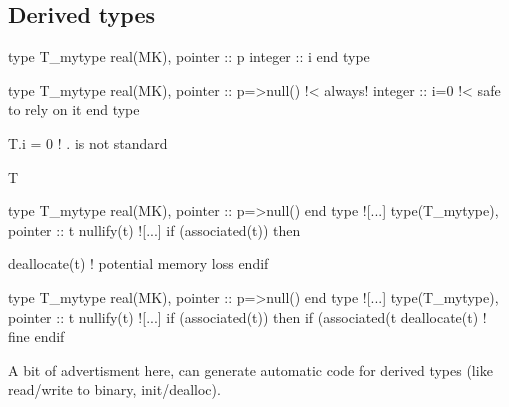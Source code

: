 \documentclass{article}
\begin{document}
\subsection{Derived types}
\label{sec:derivedtypes}
\begin{codea}
type T_mytype
  real(MK), pointer :: p
  integer :: i
end type
\end{codea} 
\begin{codeb}
type T_mytype
  real(MK), pointer :: p=>null() !< always!
  integer :: i=0 !< safe to rely on it
end type
\end{codeb}
\begin{codea}
T.i = 0 ! . is not standard
\end{codea} 
\begin{codeb}
T%
\end{codeb}
\begin{codea}
type T_mytype
  real(MK), pointer :: p=>null() 
end type
![...]
type(T_mytype), pointer :: t
nullify(t)
![...]
if (associated(t)) then 

   deallocate(t) ! potential memory loss
endif
\end{codea} 
\begin{codeb}
type T_mytype
  real(MK), pointer :: p=>null()
end type
![...]
type(T_mytype), pointer :: t
nullify(t)
![...]
if (associated(t)) then
    if (associated(t%
    deallocate(t) ! fine
endif
\end{codeb}
A bit of advertisment here,  can generate automatic code for derived types (like read/write to binary, init/dealloc). 



\end{document}
